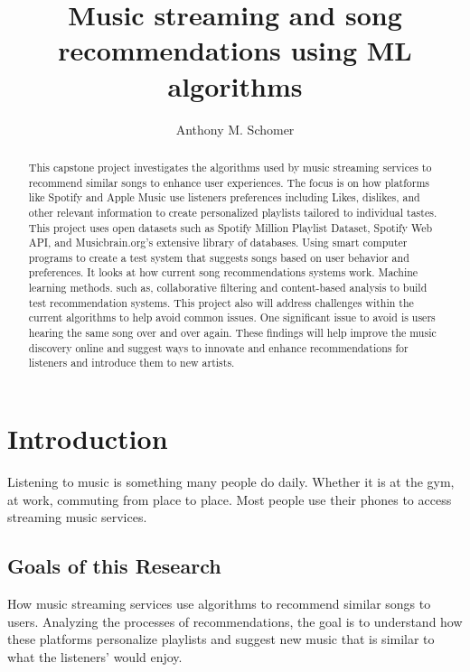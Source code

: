 \documentclass[runningheads]{llncs}
\begin{document}
%
\title{Music streaming and song recommendations using ML algorithms}
%
%
\author{Anthony M. Schomer}
%
%
%
\maketitle              %
%
\begin{abstract}
This capstone project investigates the algorithms used by music streaming services to recommend similar songs to enhance user experiences. The focus is on how platforms like Spotify and Apple Music use listeners preferences including Likes, dislikes, and other relevant information to create personalized playlists tailored to individual tastes. This project uses open datasets such as Spotify Million Playlist Dataset, Spotify Web API, and Musicbrain.org's extensive library of databases. Using smart computer programs to create a test system that suggests songs based on user behavior and preferences. It looks at how current song recommendations systems work. Machine learning methods. such as, collaborative filtering and content-based analysis to build test recommendation systems. This project also will address challenges within the current algorithms to help avoid common issues. One significant issue to avoid is users hearing the same song over and over again. These findings will help improve the music discovery online and suggest ways to innovate and enhance recommendations for listeners and introduce them to new artists. 

\end{abstract}
%
%
%
\section{Introduction}

Listening to music is something many people do daily. Whether it is at the gym, at work, commuting from place to place. Most people use their phones to access streaming music services.

\subsection{Goals of this Research} 
How music streaming services use algorithms to recommend similar songs to users. 
Analyzing the processes of recommendations, the goal is to understand how these platforms personalize playlists and suggest new music that is similar to what the listeners' would enjoy.
\end{document}
